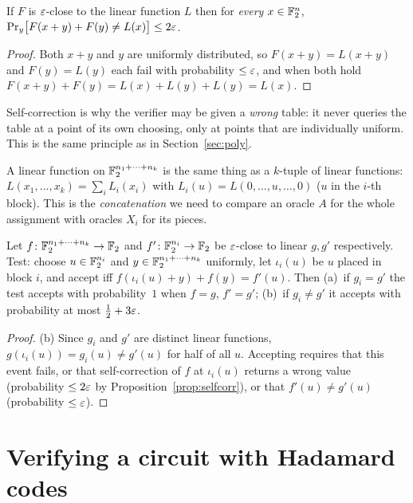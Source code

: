 \begin{proposition}\label{prop:selfcorr}
If $F$ is $\varepsilon$-close to the linear function $L$ then for \emph{every} $x\in\mathbb{F}_2^n$, $\Pr_{y}\bigl[F(x+y)+F(y)\ne L(x)\bigr]\le2\varepsilon$.
\end{proposition}
\begin{proof}
Both $x+y$ and $y$ are uniformly distributed, so $F(x+y)=L(x+y)$ and $F(y)=L(y)$ each fail with probability $\le\varepsilon$, and when both hold $F(x+y)+F(y)=L(x)+L(y)+L(y)=L(x)$.
\end{proof}

\noindent
Self-correction is why the verifier may be given a \emph{wrong} table: it never queries the table at a point of its own choosing, only at points that are individually uniform.  This is the same principle as in Section~\ref{sec:poly}.

A linear function on $\mathbb{F}_2^{n_1+\cdots+n_k}$ is the same thing as a $k$-tuple of linear functions: $L(x_1,\dots,x_k)=\sum_iL_i(x_i)$ with $L_i(u)=L(0,\dots,u,\dots,0)$ ($u$ in the $i$-th block).
This is the \emph{concatenation} we need to compare an oracle $A$ for the whole assignment with oracles $X_i$ for its pieces.

\begin{proposition}\label{prop:linconcat}
Let $f\colon\mathbb{F}_2^{n_1+\dots+n_k}\to\mathbb{F}_2$ and $f'\colon\mathbb{F}_2^{n_i}\to\mathbb{F}_2$ be $\varepsilon$-close to linear $g,g'$ respectively.  Test: choose $u\in\mathbb{F}_2^{n_i}$ and $y\in\mathbb{F}_2^{n_1+\dots+n_k}$ uniformly,
let $\iota_i(u)$ be $u$ placed in block $i$, and accept iff $f(\iota_i(u)+y)+f(y)=f'(u)$.  Then (a)~if $g_i=g'$ the test accepts with probability~$1$ when $f=g$, $f'=g'$; (b)~if $g_i\ne g'$ it accepts with probability at most $\tfrac12+3\varepsilon$.
\end{proposition}
\begin{proof}
(b) Since $g_i$ and $g'$ are distinct linear functions, $g(\iota_i(u))=g_i(u)\ne g'(u)$ for half of all $u$.  Accepting requires that this event fails, or that self-correction of $f$ at $\iota_i(u)$ returns a wrong value (probability $\le2\varepsilon$ by Proposition~\ref{prop:selfcorr}), or that $f'(u)\ne g'(u)$ (probability $\le\varepsilon$).
\end{proof}


\section{Verifying a circuit with Hadamard codes}
\label{sec:had-ver}

